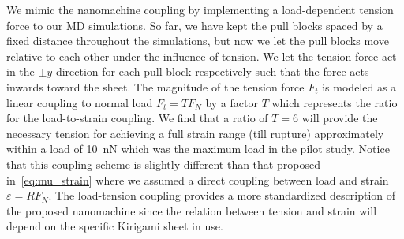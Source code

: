 We mimic the nanomachine coupling by implementing a load-dependent tension force to our \acrshort{MD} simulations. So far, we have kept the pull blocks spaced by a fixed distance throughout the simulations, but now we let the pull blocks move relative to each other under the influence of tension. We let the tension force act in the $\pm y$ direction for each pull block respectively such that the force acts inwards toward the sheet. The magnitude of the tension force $F_t$ is modeled as a linear coupling to normal load $F_t = TF_N$ by a factor $T$ which represents the ratio for the load-to-strain coupling. We find that a ratio of
$T=6$ will provide the necessary tension for achieving a full strain range (till rupture) approximately within a load of \SI{10}{nN} which was the maximum load in the pilot study. Notice that this coupling scheme is slightly different than that proposed in~\cref{eq:mu_strain} where we assumed a direct coupling between load and strain $\varepsilon = R F_N$. The load-tension coupling provides a more standardized description of the proposed nanomachine since the relation between tension and strain will depend on the specific Kirigami sheet in use. 


